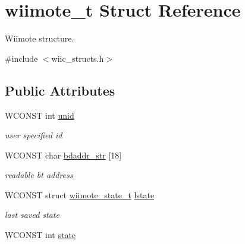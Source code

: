 \hypertarget{structwiimote__t}{\section{wiimote\-\_\-t \-Struct \-Reference}
\label{structwiimote__t}
}


\-Wiimote structure.  




{\ttfamily \#include $<$wiic\-\_\-structs.\-h$>$}

\subsection*{\-Public \-Attributes}
\begin{DoxyCompactItemize}
\item 
\hypertarget{structwiimote__t_af8d0abc503b7117566f8f36427ba558e}{\-W\-C\-O\-N\-S\-T int \hyperlink{structwiimote__t_af8d0abc503b7117566f8f36427ba558e}{unid}}\label{structwiimote__t_af8d0abc503b7117566f8f36427ba558e}

\begin{DoxyCompactList}\small\item\em user specified id \end{DoxyCompactList}\item 
\hypertarget{structwiimote__t_aeaefc436546e371cc5fa15cc866ba802}{\-W\-C\-O\-N\-S\-T char \hyperlink{structwiimote__t_aeaefc436546e371cc5fa15cc866ba802}{bdaddr\-\_\-str} \mbox{[}18\mbox{]}}\label{structwiimote__t_aeaefc436546e371cc5fa15cc866ba802}

\begin{DoxyCompactList}\small\item\em readable bt address \end{DoxyCompactList}\item 
\hypertarget{structwiimote__t_a1b18fd0743add3b1bdb97f2bb2e41679}{\-W\-C\-O\-N\-S\-T struct \hyperlink{structwiimote__state__t}{wiimote\-\_\-state\-\_\-t} \hyperlink{structwiimote__t_a1b18fd0743add3b1bdb97f2bb2e41679}{lstate}}\label{structwiimote__t_a1b18fd0743add3b1bdb97f2bb2e41679}

\begin{DoxyCompactList}\small\item\em last saved state \end{DoxyCompactList}\item 
\hypertarget{structwiimote__t_aa8d3f1b4b7c6b5d4de3cb5750f0e509a}{\-W\-C\-O\-N\-S\-T int \hyperlink{structwiimote__t_aa8d3f1b4b7c6b5d4de3cb5750f0e509a}{state}}\label{structwiimote__t_aa8d3f1b4b7c6b5d4de3cb5750f0e509a}


\end{DoxyCompactItemize}
